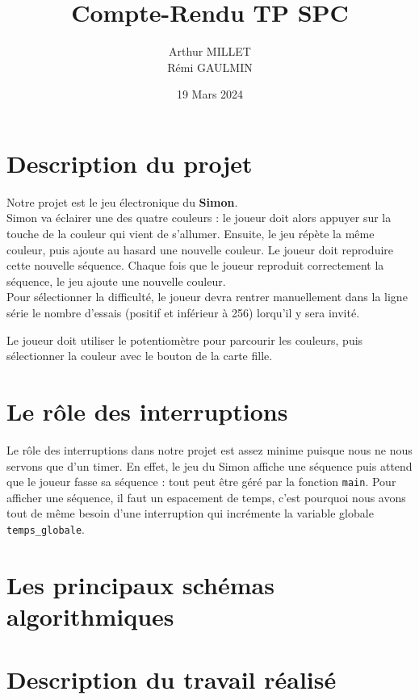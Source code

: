 \documentclass[10pt,a4,french]{article}
\title{Compte-Rendu TP SPC}
\author{Arthur MILLET\\ Rémi GAULMIN}
\date{19 Mars 2024}
\begin{document}
\lstset{language=C, frame=single}

\maketitle

\section{Description du projet}

Notre projet est le jeu électronique du \textbf{Simon}.
\\

Simon va éclairer une des quatre couleurs :
le joueur doit alors appuyer sur la touche de la couleur qui vient de s'allumer.
Ensuite, le jeu répète la même couleur, puis ajoute au hasard une nouvelle couleur.
Le joueur doit reproduire cette nouvelle séquence.
Chaque fois que le joueur reproduit correctement la séquence, le jeu ajoute une nouvelle couleur.
\\

Pour sélectionner la difficulté, le joueur devra rentrer manuellement dans la ligne série le nombre d'essais (positif et inférieur à 256) lorqu'il y sera invité.

Le joueur doit utiliser le potentiomètre pour parcourir les couleurs,
puis sélectionner la couleur avec le bouton de la carte fille.

\section{Le rôle des interruptions}

Le rôle des interruptions dans notre projet est assez minime puisque nous ne nous servons que d'un timer.
En effet, le jeu du Simon affiche une séquence puis attend que le joueur fasse sa séquence : tout peut être géré par la fonction \texttt{main}.
Pour afficher une séquence, il faut un espacement de temps,
c'est pourquoi nous avons tout de même besoin d'une interruption qui incrémente la variable globale \texttt{temps\_globale}.

\section{Les principaux schémas algorithmiques}


\section{Description du travail réalisé}
\end{document}
